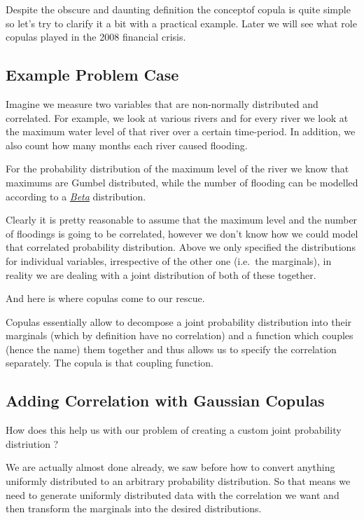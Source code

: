 Despite the obscure and daunting definition the conceptof copula is
quite simple so let's try to clarify it a bit with a practical example.
Later we will see what role copulas played in the 2008 financial crisis.

\subsection{Example Problem Case}\label{example-problem-case}

Imagine we measure two variables that are non-normally distributed and
correlated. For example, we look at various rivers and for every river
we look at the maximum water level of that river over a certain
time-period. In addition, we also count how many months each river
caused flooding.

For the probability distribution of the maximum level of the river we
know that maximums are Gumbel distributed, while the number of flooding
can be modelled according to a
\href{https://en.wikipedia.org/wiki/Beta_distribution}{\emph{Beta}}
distribution.

Clearly it is pretty reasonable to assume that the maximum level and the
number of floodings is going to be correlated, however we don't know how
we could model that correlated probability distribution. Above we only
specified the distributions for individual variables, irrespective of
the other one (i.e.~the marginals), in reality we are dealing with a
joint distribution of both of these together.

And here is where copulas come to our rescue.

Copulas essentially allow to decompose a joint probability distribution
into their marginals (which by definition have no correlation) and a
function which couples (hence the name) them together and thus allows us
to specify the correlation separately. The copula is that coupling
function.

\subsection{Adding Correlation with Gaussian
Copulas}\label{adding-correlation-with-gaussian-copulas}

How does this help us with our problem of creating a custom joint
probability distriution ?

We are actually almost done already, we saw before how to convert
anything uniformly distributed to an arbitrary probability distribution.
So that means we need to generate uniformly distributed data with the
correlation we want and then transform the marginals into the desired
distributions.


